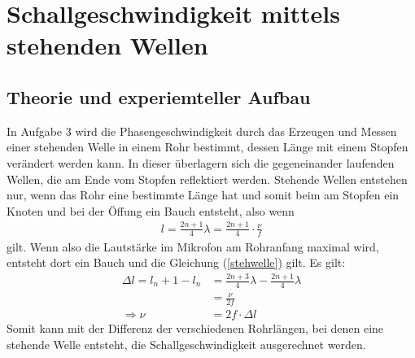 \documentclass[11pt, a4paper]{article}
\begin{document}
    \section{Schallgeschwindigkeit mittels stehenden Wellen}

    \subsection{Theorie und experiemteller Aufbau}
    In Aufgabe 3 wird die Phasengeschwindigkeit durch das Erzeugen und Messen 
    einer stehenden Welle in einem Rohr bestimmt, dessen Länge mit einem Stopfen verändert werden kann.
    In dieser überlagern sich die gegeneinander laufenden Wellen,
    die  am Ende vom Stopfen reflektiert werden. Stehende Wellen entstehen nur, wenn das Rohr eine bestimmte Länge hat
    und somit beim am Stopfen ein Knoten und bei der Öffung ein Bauch entsteht, also wenn
    \begin{align} \label{stehwelle}
        l = \frac{2n+1}{4} \lambda = \frac{2n + 1}{4} \cdot \frac{\nu}{f}
    \end{align}
    gilt. Wenn also die Lautstärke im Mikrofon am Rohranfang maximal wird, entsteht dort ein Bauch und die Gleichung
    (\ref{stehwelle}) gilt. Es gilt: 
    \begin{align}
        \Delta l = l_n+1 - l_n &= \frac{2n+3}{4} \lambda - \frac{2n+1}{4} \lambda \nonumber \\
        &= \frac{\nu}{2f} \nonumber \\
         \Rightarrow \nu &= 2f \cdot \Delta l
    \end{align}
    Somit kann mit der Differenz der verschiedenen Rohrlängen, bei denen eine stehende Welle 
    entsteht, die Schallgeschwindigkeit ausgerechnet werden.
\end{document}
